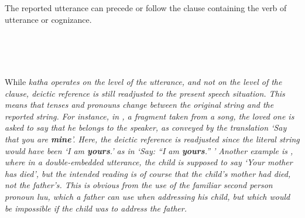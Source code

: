 
The reported utterance can precede  or follow  the clause containing the verb of utterance or cognizance.

 \\
 \\ 
 \\




While \em katha \em operates on the level of the utterance, and not on the level of the clause, deictic reference is still readjusted to the present speech situation. This means that tenses and pronouns change between the original string and the reported string. For instance, in , a fragment taken from a song, the loved one is asked to say that he belongs to the speaker, as conveyed by the translation `Say that you are \textbf{mine}'. Here, the deictic reference is readjusted since the literal string would have been `I am \textbf{yours}.' as in `Say: ``I am \textbf{yours}.'' ' Another example is , where in a double-embedded utterance, the child is supposed to say `Your mother has died', but the intended reading is of course that the child's mother had died, not the father's. This is obvious from the use of the familiar second person pronoun \em luu\em, which a father can use when addressing his child, but which would be impossible if the child was to address the father.

